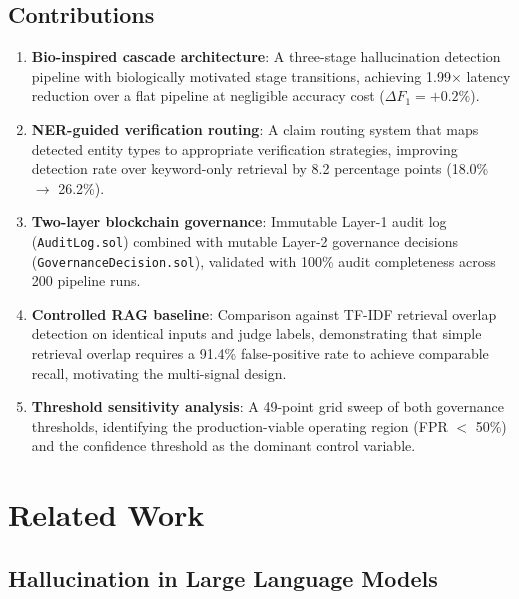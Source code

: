 \documentclass[11pt,a4paper]{article}
\newcommand{\fone}{F_1}
\begin{document}
\subsection{Contributions}
\begin{enumerate}
\item \textbf{Bio-inspired cascade architecture}: A three-stage hallucination
      detection pipeline with biologically motivated stage transitions, achieving
      1.99$\times$ latency reduction over a flat pipeline at negligible accuracy
      cost ($\Delta\fone = +0.2\%$).

\item \textbf{NER-guided verification routing}: A claim routing system that maps
      detected entity types to appropriate verification strategies, improving
      detection rate over keyword-only retrieval by 8.2 percentage points
      (18.0\% $\to$ 26.2\%).

\item \textbf{Two-layer blockchain governance}: Immutable Layer-1 audit log
      (\texttt{AuditLog.sol}) combined with mutable Layer-2 governance decisions
      (\texttt{GovernanceDecision.sol}), validated with 100\% audit completeness
      across 200 pipeline runs.

\item \textbf{Controlled RAG baseline}: Comparison against TF-IDF retrieval
      overlap detection on identical inputs and judge labels, demonstrating that
      simple retrieval overlap requires a 91.4\% false-positive rate to achieve
      comparable recall, motivating the multi-signal design.

\item \textbf{Threshold sensitivity analysis}: A 49-point grid sweep of both
      governance thresholds, identifying the production-viable operating region
      (FPR $<$ 50\%) and the confidence threshold as the dominant control
      variable.
\end{enumerate}

\section{Related Work}
\label{sec:related}

\subsection{Hallucination in Large Language Models}
\end{document}
